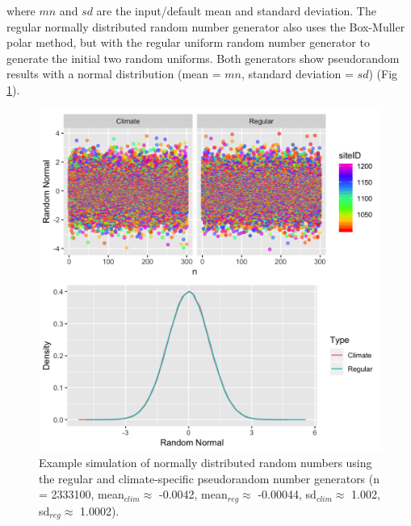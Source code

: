 \documentclass[a4paper, 12pt] {report}
\begin{document}
where $mn$ and $sd$ are the input/default mean and standard deviation. The regular normally distributed random number generator also uses the Box-Muller polar method, but with the regular uniform random number generator to generate the initial two random uniforms. Both generators show pseudorandom results with a normal distribution (mean = $mn$, standard deviation = $sd$) (Fig \ref{fig:nrand}).

\begin{figure}
  \includegraphics[width=0.8\linewidth]{Figures/Nrand.png}
  \caption{Example simulation of normally distributed random numbers using the regular and climate-specific pseudorandom number generators (n = 2333100, mean$_{clim} \approx$ -0.0042, mean$_{reg} \approx$ -0.00044, sd$_{clim} \approx$ 1.002, sd$_{reg} \approx$ 1.0002).}
  \label{fig:nrand}
\end{figure}

 
 
 
\end{document}
